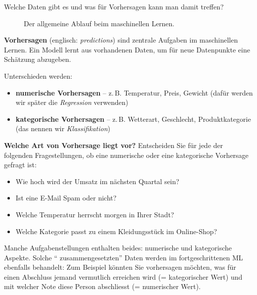 \begin{lpu}{Welche Daten gibt es und was für Vorhersagen kann man damit treffen?}
\begin{figure}
\begin{center}
\end{center}
\caption{Der allgemeine Ablauf beim maschinellen Lernen.}
\end{figure}


\begin{theorie}
\textbf{Vorhersagen} (englisch: \emph{predictions}) sind zentrale Aufgaben im maschinellen Lernen. Ein Modell lernt aus vorhandenen Daten, um f\"ur neue Datenpunkte eine Sch\"atzung abzugeben.

Unterschieden werden:
\begin{itemize}
  \item \textbf{numerische Vorhersagen} – z.\,B. Temperatur, Preis, Gewicht (dafür werden wir später die \emph{Regression} verwenden)
  \item \textbf{kategorische Vorhersagen} – z.\,B. Wetterart, Geschlecht, Produktkategorie (das nennen wir \emph{Klassifikation})
\end{itemize}
\end{theorie}

\begin{aufgabe}{6}
\textbf{Welche Art von Vorhersage liegt vor?} Entscheiden Sie f\"ur jede der folgenden Fragestellungen, ob eine numerische oder eine kategorische Vorhersage gefragt ist:
\begin{itemize}
  \item Wie hoch wird der Umsatz im n\"achsten Quartal sein?
  \item Ist eine E-Mail Spam oder nicht?
  \item Welche Temperatur herrscht morgen in Ihrer Stadt?
  \item Welche Kategorie passt zu einem Kleidungsst\"uck im Online-Shop?
\end{itemize}
\end{aufgabe}

\begin{hinweis}
Manche Aufgabenstellungen enthalten beides: numerische und kategorische Aspekte. Solche `` zusammengesetzten'' Daten werden im fortgeschrittenen ML ebenfalls behandelt: Zum Beispiel könnten Sie vorhersagen möchten, was für einen Abschluss jemand vermutlich erreichen wird (= kategorischer Wert) und mit welcher Note diese Person abschliesst (= numerischer Wert).
\end{hinweis}


\end{lpu}
